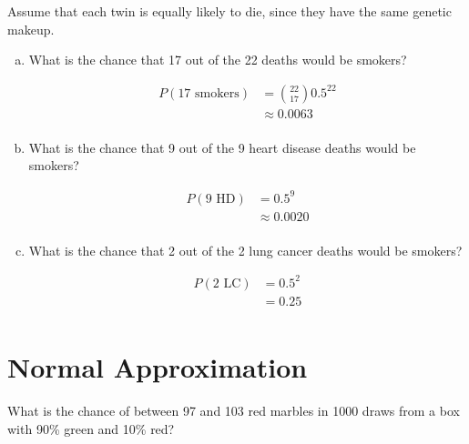 \documentclass[letterpaper, landscape]{exam}
\begin{document}
\begin{enumerate}
      Assume that each twin is equally likely to die, since they have the same
      genetic makeup.

      \begin{enumerate}[(a)]
        \item What is the chance that 17 out of the 22 deaths would be smokers?
          \begin{solution}
            \begin{align*}
              P(\text{17 smokers}) & = \binom{22}{17} 0.5^{22} \\
                                   & \approx \boxed{ 0.0063 } \\
            \end{align*}
          \end{solution}

        \item What is the chance that 9 out of the 9 heart disease deaths would
          be smokers?
          \begin{solution}
            \begin{align*}
              P(\text{9 HD}) & = 0.5^{9} \\
                                   & \approx \boxed{ 0.0020 } \\
            \end{align*}
          \end{solution}

        \item What is the chance that 2 out of the 2 lung cancer deaths would
          be smokers?
          \begin{solution}
            \begin{align*}
              P(\text{2 LC}) & = 0.5^{2} \\
                                   & = \boxed{ 0.25 } \\
            \end{align*}
          \end{solution}

      \end{enumerate}
  \end{enumerate}

  \section{Normal Approximation}

  What is the chance of between 97 and 103 red marbles in 1000 draws from a box
  with 90\% green and 10\% red?
\end{document}

